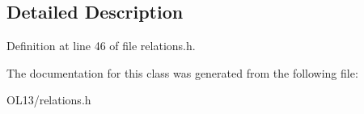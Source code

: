 \subsection{Detailed Description}


Definition at line 46 of file relations.\+h.



The documentation for this class was generated from the following file\+:\begin{DoxyCompactItemize}
\item 
O\+L13/relations.\+h\end{DoxyCompactItemize}
